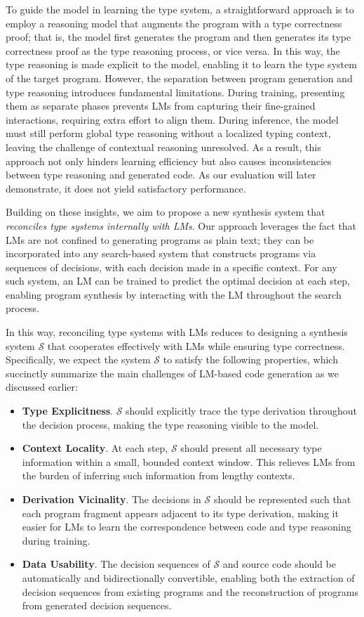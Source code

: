 \documentclass[manuscript,screen]{acmart}
\begin{document}
To guide the model in learning the type system, a straightforward approach is to employ a reasoning model that augments the program with a type correctness proof; that is, the model first generates the program and then generates its type correctness proof as the type reasoning process, or vice versa. In this way, the type reasoning is made explicit to the model, enabling it to learn the type system of the target program.
%
However, the separation between program generation and type reasoning introduces fundamental limitations. During training, presenting them as separate phases prevents LMs from capturing their fine-grained interactions, requiring extra effort to align them. During inference, the model must still perform global type reasoning without  {\color{revblue}a } localized typing context, leaving the challenge of contextual reasoning unresolved.
%
As a result, this approach not only hinders learning efficiency but also causes inconsistencies between type reasoning and generated code. As our evaluation will later demonstrate, it does not yield satisfactory performance.

Building on these insights, we aim to propose a new synthesis system that \emph{reconciles type systems internally with LMs}. 
Our approach leverages the fact that LMs are not confined to generating programs as plain text; they can be incorporated into any search-based system that constructs programs via sequences of decisions, with each decision made in a specific context. 
For any such system, an LM can be trained to predict the optimal decision at each step, enabling program synthesis by interacting with the LM throughout the search process.

In this way, reconciling type systems with LMs reduces to designing a synthesis system $\mathcal S$ that cooperates effectively with LMs while ensuring type correctness.
Specifically, we expect the system $\mathcal S$ to satisfy the following properties, which succinctly summarize the main challenges of LM-based code generation as we discussed earlier:
\begin{itemize}
 \item \textbf{Type Explicitness}. $\mathcal{S}$ should explicitly trace the type derivation throughout the decision process, making the type reasoning visible to the model.
 \item \textbf{Context Locality}. At each step, $\mathcal{S}$ should present all necessary type information within a small, bounded context window. This relieves LMs from the burden of inferring such information from lengthy contexts.
 \item \textbf{Derivation Vicinality}. The decisions in $\mathcal{S}$ should be represented such that each program fragment appears adjacent to its type derivation, making it easier for LMs to learn the correspondence between code and type reasoning during training.
 \item \textbf{Data Usability}. The decision sequences of $\mathcal{S}$ and source code should be automatically and bidirectionally convertible, enabling both the extraction of decision sequences from existing programs and the reconstruction of programs from generated decision sequences.
\end{itemize}
\end{document}
